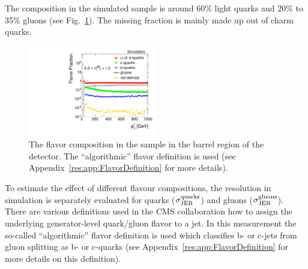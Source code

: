 The composition in the simulated \pythia \GAMJET sample is around 60\% light quarks and 20\% to 35\% gluons (see Fig.~\ref{res:fig:FlavorFraction}). 
The missing fraction is mainly made up out of charm quarks. 
\begin{figure}[b]
  \centering
      \includegraphics[width=0.50\textwidth]{figures/resolution/systematicUncertainties/flavorFraction_barrel_algo.pdf}
  \caption{The flavor composition in the \GAMJET sample in the barrel region of the detector. The ``algorithmic'' flavor definition is used (see Appendix~\ref{res:app:FlavorDefinition} for more details).}  
  \label{res:fig:FlavorFraction}
\end{figure}

To estimate the effect of different flavour compositions, the resolution in simulation is separately evaluated for quarks ($\sigma_\mathrm{JER}^\text{quarks}$) and gluons ($\sigma_\mathrm{JER}^\text{gluons}$). 
There are various definitions used in the CMS collaboration how to assign the underlying generator-level quark/gluon flavor to a jet.
In this measurement the so-called ``algorithmic'' flavor definition is used which classifies b- or c-jets from gluon splitting as b- or c-quarks (see Appendix~\ref{res:app:FlavorDefinition} for more details on this definition).

